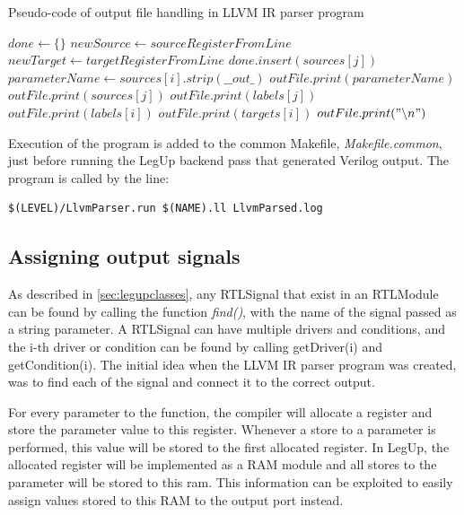 \begin{algorithm}
  \caption{Pseudo-code of output file handling in LLVM IR parser program
  \label{alg:llvmparserpart2}}
  \begin{algorithmic}[1]
    \State $done \leftarrow \{\}$
            \State $newSource \leftarrow sourceRegisterFromLine$
            \State $newTarget \leftarrow targetRegisterFromLine$
            \State $done.insert(sources[j])$
              \State $parameterName \leftarrow sources[i].strip(\_\_out\_)$
              \State $outFile.print(parameterName)$
              \State $outFile.print(sources[j])$
              \State $outFile.print(labels[j])$
              \State $outFile.print(labels[i])$
              \State $outFile.print(targets[i])$
              \State $outFile.print("\backslash n")$ 
            \EndIf
          \EndIf
        \EndFor
      \EndFor
    \EndIf
  \end{algorithmic}
\end{algorithm}
Execution of the program is added to the common Makefile, \textit{Makefile.common}, just before running the LegUp backend pass that generated Verilog output. The program is called by the line:
\begin{verbatim}
$(LEVEL)/LlvmParser.run $(NAME).ll LlvmParsed.log
\end{verbatim}

\subsection{\label{subsec:assigningoutputsignals}Assigning output signals}
As described in \cref{sec:legupclasses}, any RTLSignal that exist in an RTLModule can be found by calling the function \textit{find()}, with the name of the signal passed as a string parameter. A RTLSignal can have multiple drivers and conditions, and the i-th driver or condition can be found by calling getDriver(i) and getCondition(i). The initial idea when the LLVM IR parser program was created, was to find each of the signal and connect it to the correct output.

For every parameter to the function, the compiler will allocate a register and store the parameter value to this register. Whenever a store to a parameter is performed, this value will be stored to the first allocated register. In LegUp, the allocated register will be implemented as a RAM module and all stores to the parameter will be stored to this ram. This information can be exploited to easily assign values stored to this RAM to the output port instead.


